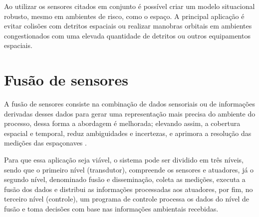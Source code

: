 Ao utilizar os sensores citados em conjunto é possível criar um modelo situacional robusto, mesmo em ambientes de risco, como o espaço.
A principal aplicação é evitar colisões com detritos espaciais ou realizar manobras orbitais em ambientes congestionados com uma elevada quantidade de detritos ou outros equipamentos espaciais.

\section{Fusão de sensores}

A fusão de sensores consiste na combinação de dados sensoriais ou de informações derivadas desses dados para gerar uma representação mais precisa do ambiente do processo, dessa forma a abordagem é melhorada; elevando assim, a cobertura espacial e temporal, reduz ambiguidades e incertezas, e aprimora a resolução das medições das espaçonaves \cite{elmenreichDissertation}.

Para que essa aplicação seja viável, o sistema pode ser dividido em três níveis, sendo que o primeiro nível (transdutor), compreende os sensores e atuadores, já o segundo nível, denominado fusão e disseminação, coleta as medições, executa a fusão dos dados e distribui as informações processadas aos atuadores, por fim, no terceiro nível (controle), um programa de controle processa os dados do nível de fusão e toma decisões com base nas informações ambientais recebidas.




